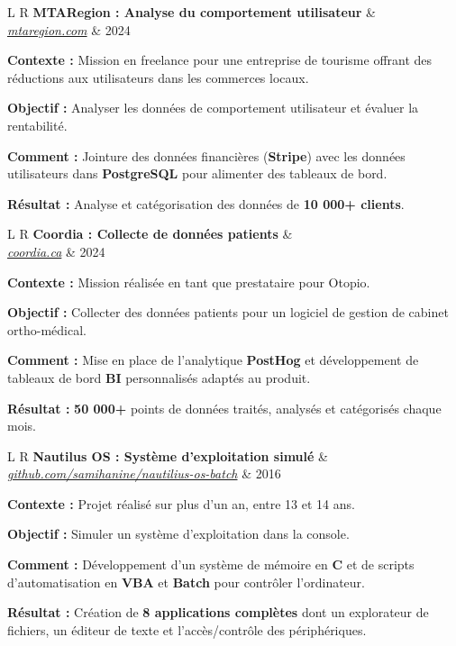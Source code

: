 \documentclass[a4paper,10pt]{article}
\newcommand{\resumeSubheading}[4]{%
  \item
    \begin{tabularx}{\linewidth}{L R}
      \textbf{#1} & \textit{\footnotesize #2} \\
      \textit{\footnotesize #3} & \footnotesize #4 \\
    \end{tabularx}
}
\newcommand{\resumeItem}[1]{\item #1}
\begin{document}
  \resumeSubheading
    {MTARegion : Analyse du comportement utilisateur}{}{\href{https://mtaregion.com/}{mtaregion.com}}{2024}
    \projItemStart
      \resumeItem{\textbf{Contexte :} Mission en freelance pour une entreprise de tourisme offrant des réductions aux utilisateurs dans les commerces locaux.}
      \resumeItem{\textbf{Objectif :} Analyser les données de comportement utilisateur et évaluer la rentabilité.}
      \resumeItem{\textbf{Comment :} Jointure des données financières (\textbf{Stripe}) avec les données utilisateurs dans \textbf{PostgreSQL} pour alimenter des tableaux de bord.}
      \resumeItem{\textbf{Résultat :} Analyse et catégorisation des données de \textbf{10 000+ clients}.}
    \projItemEnd

  \resumeSubheading
    {Coordia : Collecte de données patients}{}{\href{https://www.coordia.ca/}{coordia.ca}}{2024}
    \projItemStart
      \resumeItem{\textbf{Contexte :} Mission réalisée en tant que prestataire pour Otopio.}
      \resumeItem{\textbf{Objectif :} Collecter des données patients pour un logiciel de gestion de cabinet ortho-médical.}
      \resumeItem{\textbf{Comment :} Mise en place de l'analytique \textbf{PostHog} et développement de tableaux de bord \textbf{BI} personnalisés adaptés au produit.}
      \resumeItem{\textbf{Résultat :} \textbf{50 000+} points de données traités, analysés et catégorisés chaque mois.}
    \projItemEnd

  \resumeSubheading
    {Nautilus OS : Système d'exploitation simulé}{}{\href{https://github.com/samihanine/nautilius-os-batch}{github.com/samihanine/nautilius-os-batch}}{2016}
    \projItemStart
      \resumeItem{\textbf{Contexte :} Projet réalisé sur plus d'un an, entre 13 et 14 ans.}
      \resumeItem{\textbf{Objectif :} Simuler un système d'exploitation dans la console.}
      \resumeItem{\textbf{Comment :} Développement d'un système de mémoire en \textbf{C} et de scripts d'automatisation en \textbf{VBA} et \textbf{Batch} pour contrôler l'ordinateur.}
      \resumeItem{\textbf{Résultat :} Création de \textbf{8 applications complètes} dont un explorateur de fichiers, un éditeur de texte et l'accès/contrôle des périphériques.}
    \projItemEnd

\projListEnd
\end{document}

